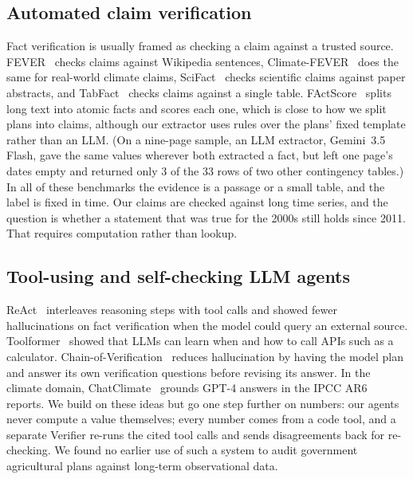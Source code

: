 \subsection{Automated claim verification}
Fact verification is usually framed as checking a claim against a trusted source.
FEVER~\cite{thorne2018fever} checks claims against Wikipedia sentences,
Climate-FEVER~\cite{diggelmann2020climatefever} does the same for real-world climate
claims, SciFact~\cite{wadden2020scifact} checks scientific claims against paper
abstracts, and TabFact~\cite{chen2020tabfact} checks claims against a single table.
FActScore~\cite{min2023factscore} splits long text into atomic facts and scores each
one, which is close to how we split plans into claims, although our extractor uses rules
over the plans' fixed template rather than an LLM. (On a nine-page sample, an LLM
extractor, Gemini~3.5 Flash, gave the same values wherever both extracted a fact, but
left one page's dates empty and returned only 3 of the 33 rows of two other contingency
tables.) In all of these benchmarks the evidence is
a passage or a small table, and the label is fixed in time. Our claims are checked
against long time series, and the question is whether a statement that was true
for the 2000s still holds since 2011. That requires computation rather than lookup.

\subsection{Tool-using and self-checking LLM agents}
ReAct~\cite{yao2023react} interleaves reasoning steps with tool calls and showed
fewer hallucinations on fact verification when the model could query an external
source. Toolformer~\cite{schick2023toolformer} showed that LLMs can learn when and how
to call APIs such as a calculator. Chain-of-Verification~\cite{dhuliawala2024cove}
reduces hallucination by having the model plan and answer its own verification
questions before revising its answer. In the climate domain,
ChatClimate~\cite{vaghefi2023chatclimate} grounds GPT-4 answers in the IPCC AR6
reports. We build on these ideas but go one step further on numbers: our agents never
compute a value themselves; every number comes from a code tool, and a separate
Verifier re-runs the cited tool calls and sends disagreements back for re-checking.
We found no earlier use of such a system to audit government agricultural plans
against long-term observational data.
